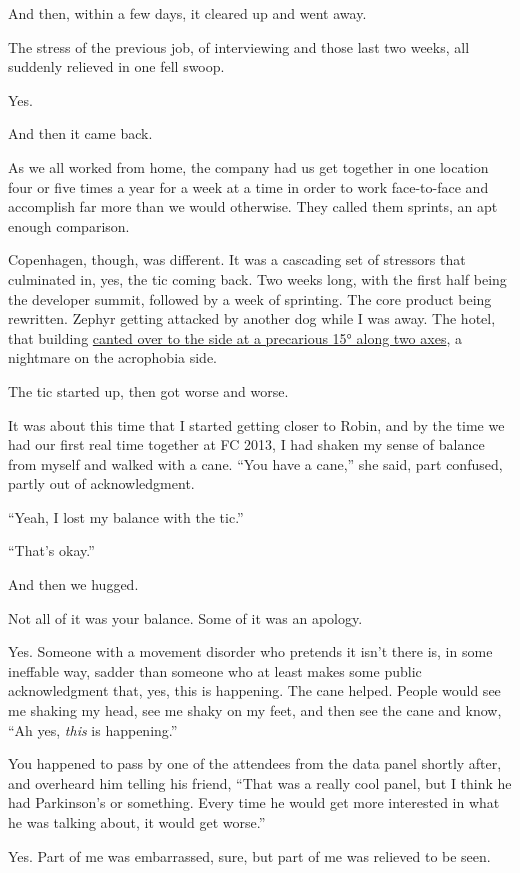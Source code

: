 \begin{paracol}{2}
\begin{leftcolumn}
And then, within a few days, it cleared up and went away.

\begin{ally}
The stress of the previous job, of interviewing and those last two weeks, all suddenly relieved in one fell swoop.
\end{ally}
Yes.

\begin{ally}
And then it came back.
\end{ally}
As we all worked from home, the company had us get together in one location four or five times a year for a week at a time in order to work face-to-face and accomplish far more than we would otherwise. They called them sprints, an apt enough comparison.

Copenhagen, though, was different. It was a cascading set of stressors that culminated in, yes, the tic coming back. Two weeks long, with the first half being the developer summit, followed by a week of sprinting. The core product being rewritten. Zephyr getting attacked by another dog while I was away. The hotel, that building \href{/movement/copenhotel.jpg}{canted over to the side at a precarious 15° along two axes}, a nightmare on the acrophobia side.

The tic started up, then got worse and worse.

It was about this time that I started getting closer to Robin, and by the time we had our first real time together at FC 2013, I had shaken my sense of balance from myself and walked with a cane. ``You have a cane,'' she said, part confused, partly out of acknowledgment.

``Yeah, I lost my balance with the tic.''

``That's okay.''

And then we hugged.

\begin{ally}
Not all of it was your balance. Some of it was an apology.
\end{ally}
Yes. Someone with a movement disorder who pretends it isn't there is, in some ineffable way, sadder than someone who at least makes some public acknowledgment that, yes, this is happening. The cane helped. People would see me shaking my head, see me shaky on my feet, and then see the cane and know, ``Ah yes, \emph{this} is happening.''

\begin{ally}
You happened to pass by one of the attendees from the data panel shortly after, and overheard him telling his friend, ``That was a really cool panel, but I think he had Parkinson's or something. Every time he would get more interested in what he was talking about, it would get worse.''
\end{ally}
Yes. Part of me was embarrassed, sure, but part of me was relieved to be seen.
\newpage


\end{leftcolumn}
\end{paracol}
